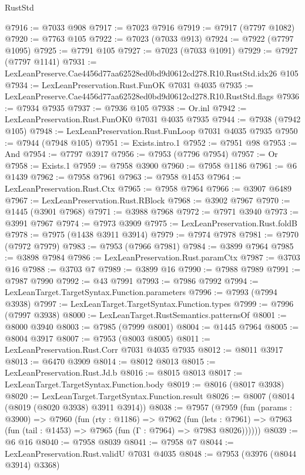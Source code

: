 \begin{lexlean}{RustStd}
\begin{coremodule}
@7916 := @7033 @908
@7917 := @7023 @7916
@7919 := @7917 (@7797 @1082)
@7920 := @7763 @105
@7922 := @7023 (@7033 @913)
@7924 := @7922 (@7797 @1095)
@7925 := @7791 @105
@7927 := @7023 (@7033 @1091)
@7929 := @7927 (@7797 @1141)
@7931 := LexLeanPreserve.Cae4456d77aa62528ed0bd9d0612cd278.R10.RustStd.idx26 @105
@7934 := LexLeanPreservation.Rust.FunOK @7031 @4035
@7935 := LexLeanPreserve.Cae4456d77aa62528ed0bd9d0612cd278.R10.RustStd.flags
@7936 := @7934 @7935
@7937 := @7936 @105
@7938 := Or.inl
@7942 := LexLeanPreservation.Rust.FunOK0 @7031 @4035 @7935
@7944 := @7938 (@7942 @105)
@7948 := LexLeanPreservation.Rust.FunLoop @7031 @4035 @7935
@7950 := @7944 (@7948 @105)
@7951 := Exists.intro.{1}
@7952 := @7951 @98
@7953 := And
@7954 := @7797 @3917
@7956 := @7953 (@7796 @7954)
@7957 := Or
@7958 := Exists.{1}
@7959 := @7958 @3900
@7960 := @7958 @1186
@7961 := @6 @1439
@7962 := @7958 @7961
@7963 := @7958 @1453
@7964 := LexLeanPreservation.Rust.Ctx
@7965 := @7958 @7964
@7966 := @3907 @6489
@7967 := LexLeanPreservation.Rust.RBlock
@7968 := @3902 @7967
@7970 := @1445 (@3901 @7968)
@7971 := @3988 @7968
@7972 := @7971 @3940
@7973 := @3991 @7967
@7974 := @7973 @3909
@7975 := LexLeanPreservation.Rust.foldB
@7978 := @7975 (@1438 @3911 @3914)
@7979 := @7974 @7978
@7981 := @7970 (@7972 @7979)
@7983 := @7953 (@7966 @7981)
@7984 := @3899 @7964
@7985 := @3898 @7984
@7986 := LexLeanPreservation.Rust.paramCtx
@7987 := @3703 @16
@7988 := @3703 @7
@7989 := @3899 @16
@7990 := @7988 @7989
@7991 := @7987 @7990
@7992 := @43 @7991
@7993 := @7986 @7992
@7994 := LexLeanTarget.TargetSyntax.Function.parameters
@7996 := @7993 (@7994 @3938)
@7997 := LexLeanTarget.TargetSyntax.Function.types
@7999 := @7996 (@7997 @3938)
@8000 := LexLeanTarget.RustSemantics.patternsOf
@8001 := @8000 @3940
@8003 := @7985 (@7999 @8001)
@8004 := @1445 @7964
@8005 := @8004 @3917
@8007 := @7953 (@8003 @8005)
@8011 := LexLeanPreservation.Rust.Corr @7031 @4035 @7935
@8012 := @8011 @3917
@8013 := @6470 @3909
@8014 := @8012 @8013
@8015 := LexLeanPreservation.Rust.Jd.b
@8016 := @8015 @8013
@8017 := LexLeanTarget.TargetSyntax.Function.body
@8019 := @8016 (@8017 @3938)
@8020 := LexLeanTarget.TargetSyntax.Function.result
@8026 := @8007 (@8014 (@8019 (@8020 @3938) @3911 @3914))
@8038 := @7957
    (@7959
      (fun (params : @3900) =>
      @7960
        (fun (rty : @1186) =>
        @7962
          (fun (lets : @7961) =>
          @7963 (fun (tail : @1453) => @7965 (fun (Γ : @7964) => @7983 @8026))))))
@8039 := @6 @16
@8040 := @7958 @8039
@8041 := @7958 @7
@8044 := LexLeanPreservation.Rust.validU @7031 @4035
@8048 := @7953 (@3976 (@8044 @3914) @3368)

\end{coremodule}
\end{lexlean}
